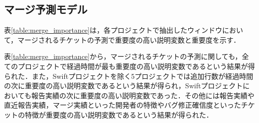 \documentclass[submit]{ipsj}
\begin{document}
\begin{table}[t]
\caption{レビュー予測モデルにおいて重要度の高い説明変数の正例と負例の有意差および違い}
\label{table:review_importance_yuisa}
\centering
\vspace{0.5zh}
\end{table}


\subsection{マージ予測モデル}
表\ref{table:merge_importance}は，各プロジェクトで抽出したウィンドウにおいて，マージされるチケットの予測で重要度の高い説明変数と重要度を示す．

表\ref{table:merge_importance}から，マージされるチケットの予測に関しても，全てのプロジェクトで経過時間が最も重要度の高い説明変数であるという結果が得られた．また，Swiftプロジェクトを除く5プロジェクトでは追加行数が経過時間の次に重要度の高い説明変数であるという結果が得られ，Swiftプロジェクトにおいても報告実績の次に重要度の高い説明変数であった．その他には報告実績や直近報告実績，マージ実績といった開発者の特徴やバグ修正確信度といったチケットの特徴が重要度の高い説明変数であるという結果が得られた．
\end{document}
